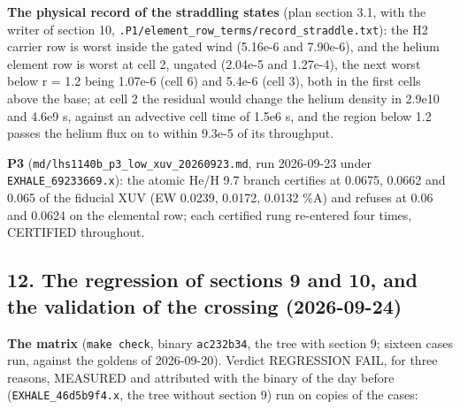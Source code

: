 \documentclass[english,a4paper]{my_memo}
\begin{document}
\textbf{The physical record of the straddling states} (plan section 3.1, with the
writer of section 10, \texttt{.P1/element\_row\_terms/record\_straddle.txt}): the H2
carrier row is worst inside the gated wind (5.16e-6 and 7.90e-6), and the
helium element row is worst at cell 2, ungated (2.04e-5 and 1.27e-4), the
next worst below r = 1.2 being 1.07e-6 (cell 6) and 5.4e-6 (cell 3), both in
the first cells above the base; at cell 2 the residual would change the helium density in 2.9e10 and
4.6e9 s, against an advective cell time of 1.5e6 s, and the region below 1.2
passes the helium flux on to within 9.3e-5 of its throughput.

\textbf{P3} (\texttt{md/lhs1140b\_p3\_low\_xuv\_20260923.md}, run 2026-09-23 under
\texttt{EXHALE\_69233669.x}): the atomic He/H 9.7 branch certifies at 0.0675, 0.0662
and 0.065 of the fiducial XUV (EW 0.0239, 0.0172, 0.0132 \%A) and refuses at
0.06 and 0.0624 on the elemental row; each certified rung re-entered four
times, CERTIFIED throughout.

\subsection{12. The regression of sections 9 and 10, and the validation of the crossing (2026-09-24)}\label{12-the-regression-of-sections-9-and-10-and-the-validation-of-the-crossing-2026-09-24}

\textbf{The matrix} (\texttt{make\ check}, binary \texttt{ac232b34}, the tree with section 9;
sixteen cases run, against the goldens of 2026-09-20). Verdict REGRESSION
FAIL, for three reasons, MEASURED and attributed with the binary of the day
before (\texttt{EXHALE\_46d5b9f4.x}, the tree without section 9) run on copies of the
cases:
\end{document}
